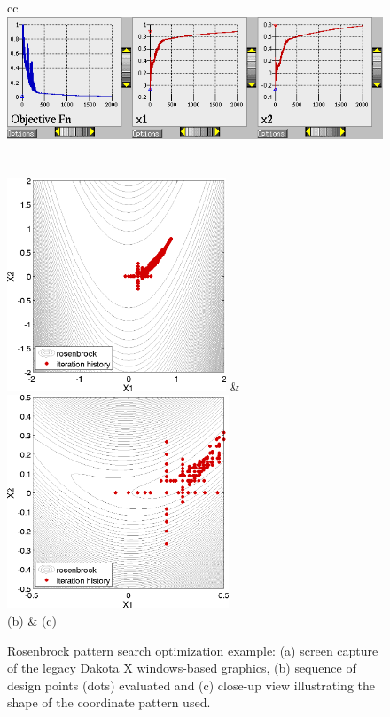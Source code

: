 \begin{figure}[ht!]
  \centering
  \begin{tabular}{cc}
	      {\includegraphics[width=\textwidth]{images/dak_graphics_ps_opt}}\\
  \\
  \qquad\\
  \includegraphics[height=2.5in]{images/rosen_ps_opt_pts} &
  \includegraphics[height=2.5in]{images/rosen_ps_opt_pts2} \\
  (b) & (c)
  \end{tabular}
  \caption{Rosenbrock pattern search optimization example: (a) screen
    capture of the legacy Dakota X windows-based graphics, (b)
    sequence of design points (dots) evaluated and (c) close-up view
    illustrating the shape of the coordinate pattern used. }
  \label{opt:methods:gradientfree:local:example:ps_graphics}
\end{figure}

